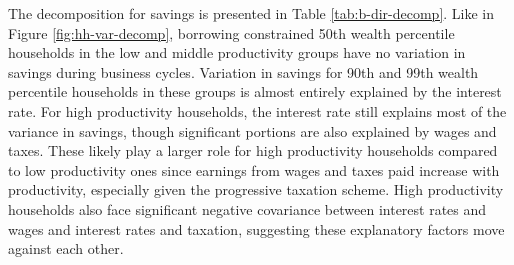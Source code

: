 The decomposition for savings is presented in Table \ref{tab:b-dir-decomp}. Like in Figure \ref{fig:hh-var-decomp}, borrowing constrained 50th wealth percentile households in the low and middle productivity groups have no variation in savings during business cycles. Variation in savings for 90th and 99th wealth percentile households in these groups is almost entirely explained by the interest rate. For high productivity households, the interest rate still explains most of the variance in savings, though significant portions are also explained by wages and taxes. These likely play a larger role for high productivity households compared to low productivity ones since earnings from wages and taxes paid increase with productivity, especially given the progressive taxation scheme. High productivity households also face significant negative covariance between interest rates and wages and interest rates and taxation, suggesting these explanatory factors move against each other.
